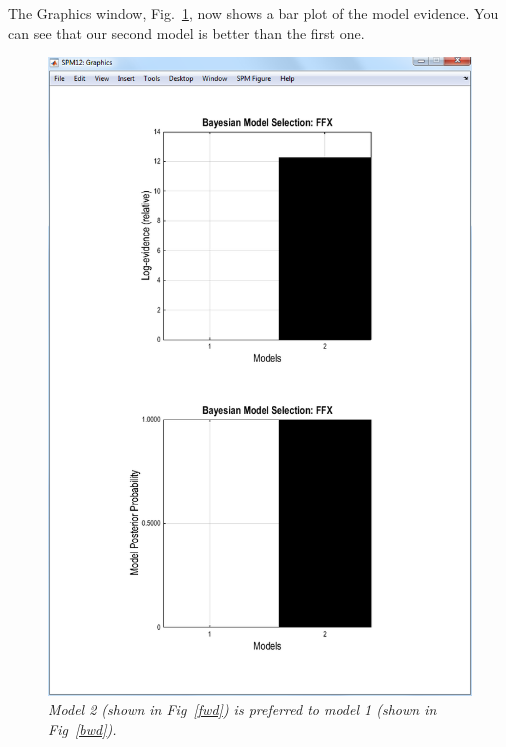 The Graphics window, Fig.~\ref{dcm_fig9}, now shows a bar plot of the model evidence. You can see that our second model is better than the first one.

\begin{figure}[ht]
\begin{center}
\includegraphics[width=140mm]{dcm/Fig9}
\caption{\em Model 2 (shown in Fig~\ref{fwd}) is preferred to model 1 (shown in Fig~\ref{bwd}).\label{dcm_fig9}}
\end{center}
\end{figure}
